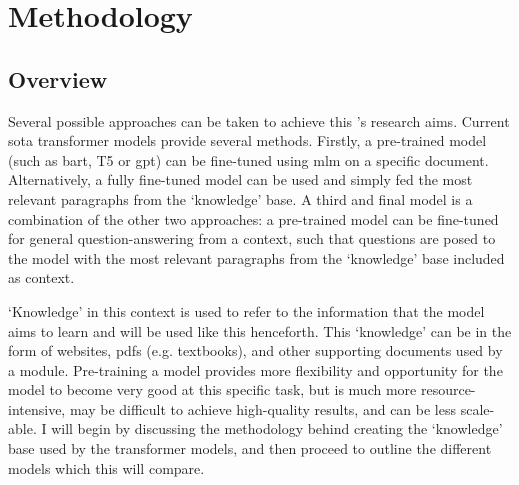 \chapter{Methodology}\label{ch:methodology}

\section{Overview}
Several possible approaches can be taken to achieve this \papertype's research aims. Current \acrshort{sota} transformer models provide several methods. Firstly, a pre-trained model (such as \acrshort{bart}, T5 or \acrshort{gpt}) can be fine-tuned using \acrfull{mlm} on a specific document. Alternatively, a fully fine-tuned model can be used and simply fed the most relevant paragraphs from the `knowledge' base. A third and final model is a combination of the other two approaches: a pre-trained model can be fine-tuned for general question-answering from a context, such that questions are posed to the model with the most relevant paragraphs from the `knowledge' base included as context.

`Knowledge' in this context is used to refer to the information that the model aims to learn and will be used like this henceforth. This `knowledge' can be in the form of websites, \acrshort{pdf}s (e.g. textbooks), and other supporting documents used by a module. Pre-training a model provides more flexibility and opportunity for the model to become very good at this specific task, but is much more resource-intensive, may be difficult to achieve high-quality results, and can be less scale-able. I will begin by discussing the methodology behind creating the `knowledge' base used by the transformer models, and then proceed to outline the different models which this \papertype will compare.


